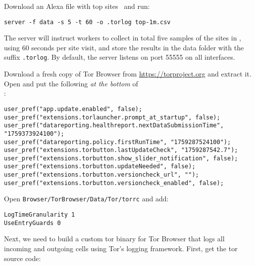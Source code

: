 \documentclass{article}
\begin{document}
Download an Alexa file with top sites~\cite{alexatop1k} and run:

\begin{lstlisting}
server -f data -s 5 -t 60 -o .torlog top-1m.csv
\end{lstlisting}
The server will instruct workers to collect in total
five samples of the sites in , using 60 seconds per site visit,
and store the results in the data folder with the suffix \texttt{.torlog}.
By default, the server listens on port 55555 on all interfaces.

Download a fresh copy of Tor Browser from \url{https://torproject.org} and
extract it.  Open
 and put the
following \emph{at the bottom} of\\ :

\begin{lstlisting}
user_pref("app.update.enabled", false);
user_pref("extensions.torlauncher.prompt_at_startup", false);
user_pref("datareporting.healthreport.nextDataSubmissionTime", "1759373924100");
user_pref("datareporting.policy.firstRunTime", "1759287524100");
user_pref("extensions.torbutton.lastUpdateCheck", "1759287542.7");
user_pref("extensions.torbutton.show_slider_notification", false);
user_pref("extensions.torbutton.updateNeeded", false);
user_pref("extensions.torbutton.versioncheck_url", "");
user_pref("extensions.torbutton.versioncheck_enabled", false);
\end{lstlisting}

Open {\tt Browser/TorBrowser/Data/Tor/torrc} and add:

\begin{lstlisting}
LogTimeGranularity 1
UseEntryGuards 0
\end{lstlisting}

Next, we need to build a custom tor binary for Tor Browser that logs all
incoming and outgoing cells using Tor's logging framework. First, get the tor
source code:
\end{document}
